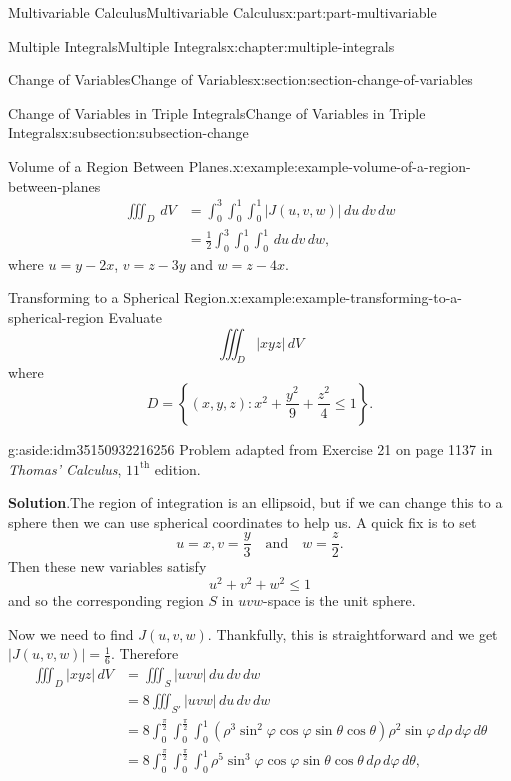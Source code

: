 \documentclass[twoside,10pt,]{book}
\newcommand{\blocktitlefont}{\relax}
\numberwithin{equation}{part}
\newcommand{\abs}[1]{\left| #1 \right|}
\newcommand{\set}[1]{\left\{ #1 \right\}}
\newcommand{\qq}[1]{\quad\text{#1}\quad}
\newcommand{\amp}{&}
\begin{document}
\begin{partptx}{Multivariable Calculus}{}{Multivariable Calculus}{}{}{x:part:part-multivariable}
\begin{chapterptx}{Multiple Integrals}{}{Multiple Integrals}{}{}{x:chapter:multiple-integrals}
\begin{sectionptx}{Change of Variables}{}{Change of Variables}{}{}{x:section:section-change-of-variables}
\begin{subsectionptx}{Change of Variables in Triple Integrals}{}{Change of Variables in Triple Integrals}{}{}{x:subsection:subsection-change}
\begin{example}{Volume of a Region Between Planes.}{x:example:example-volume-of-a-region-between-planes}
\begin{align*}
\iiint_{D}\,dV \amp = \int_{0}^{3}\int_{0}^{1}\int_{0}^{1}\abs{J(u,v,w)}\,du\,dv\,dw \\
\amp = \frac{1}{2}\int_{0}^{3}\int_{0}^{1}\int_{0}^{1}\,du\,dv\,dw \text{,}
\end{align*}
where \(u = y - 2x\), \(v = z - 3y\) and \(w = z - 4x\).%
\end{example}
\begin{example}{Transforming to a Spherical Region.}{x:example:example-transforming-to-a-spherical-region}%
Evaluate%
\begin{equation*}
\iiint_{D}\abs{xyz}\,dV
\end{equation*}
where%
\begin{equation*}
D = \set{(x,y,z) : x^{2} + \frac{y^{2}}{9} + \frac{z^{2}}{4} \leq 1}\text{.}
\end{equation*}
%
\begin{aside}{}{g:aside:idm35150932216256}%
Problem adapted from Exercise 21 on page 1137 in \emph{Thomas' Calculus}, \(11^{\text{th}}\) edition.%
\end{aside}
\par\smallskip%
\noindent\textbf{\blocktitlefont Solution}.\hypertarget{g:solution:idm35150932215104}{}\quad{}The region of integration is an ellipsoid, but if we can change this to a sphere then we can use spherical coordinates to help us. A quick fix is to set%
\begin{equation*}
u = x, v = \frac{y}{3} \qq{and} w = \frac{z}{2}\text{.}
\end{equation*}
Then these new variables satisfy%
\begin{equation*}
u^{2} + v^{2} + w^{2} \leq 1
\end{equation*}
and so the corresponding region \(S\) in \(uvw\)-space is the unit sphere.%
\par
Now we need to find \(J(u,v,w)\). Thankfully, this is straightforward and we get \(\abs{J(u,v,w)} = \frac{1}{6}\). Therefore%
\begin{align*}
\iiint_{D}\abs{xyz}\,dV \amp = \iiint_{S}\abs{uvw}\,du\,dv\,dw \\
\amp = 8\iiint_{S'}\abs{uvw}\,du\,dv\,dw \\
\amp = 8\int_{0}^{\frac{\pi}{2}}\int_{0}^{\frac{\pi}{2}}\int_{0}^{1}(\rho^{3}\sin^{2}\varphi\cos\varphi\sin\theta\cos\theta)\rho^{2}\sin\varphi\,d\rho\,d\varphi\,d\theta \\
\amp = 8\int_{0}^{\frac{\pi}{2}}\int_{0}^{\frac{\pi}{2}}\int_{0}^{1}\rho^{5}\sin^{3}\varphi\cos\varphi\sin\theta\cos\theta\,d\rho\,d\varphi\,d\theta\text{,}

\end{align*}
\end{example}
\end{subsectionptx}
\end{sectionptx}
\end{chapterptx}
\end{partptx}
\end{document}
